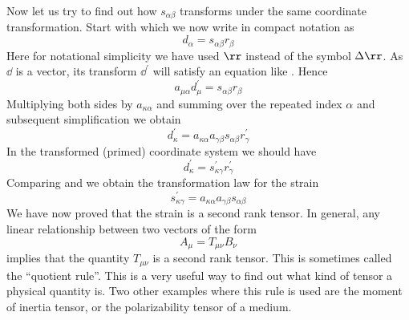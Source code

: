 \documentclass{tufte-book} %
\begin{document}
\begin{subappendices}
Now let us try to find out how $s_{\alpha\beta}$ transforms
under the same coordinate transformation. Start with 
which we now write in compact notation as 
\begin{equation}
d_{\alpha} = s_{\alpha\beta}r_{\beta}
\end{equation}
Here for notational simplicity we have used $\rr$ instead of the
symbol $\Delta \rr$. 
As $\dd$ is a vector, its transform $\dd^{\prime}$ will satisfy an 
equation like . Hence
\begin{equation}
a_{\mu\alpha}d^{\prime}_{\mu} = s_{\alpha\beta}r_{\beta}
\end{equation} 
Multiplying both sides by $a_{\kappa\alpha}$ and summing over the
repeated index $\alpha$ and subsequent simplification we obtain
\begin{equation}
d^{\prime}_{\kappa} =
  a_{\kappa\alpha}a_{\gamma\beta}s_{\alpha\beta}r^{\prime}_{\gamma}
\label{eq:ss}
\end{equation}
In the transformed (primed) coordinate system we should have 
\begin{equation}
d^{\prime}_{\kappa} = s^{\prime}_{\kappa\gamma}r^{\prime}_{\gamma}
\label{eq:sprime}
\end{equation}
Comparing  and  we obtain the transformation
law for the strain
\begin{equation}
\boxed{s^{\prime}_{\kappa\gamma} = a_{\kappa\alpha}a_{\gamma\beta}s_{\alpha\beta}}
\end{equation}
We have now proved that the strain is a second rank tensor. In
general, any linear relationship between two vectors of the form
\begin{equation}
A_{\mu} = T_{\mu\nu}B_{\nu}
\label{eq:quotient}
\end{equation}
implies that the quantity $T_{\mu\nu}$ is a second rank tensor. 
This is sometimes called the ``quotient rule''. 
This is a very useful way to find out what kind of tensor a physical
quantity is. Two other examples where this rule is used are the moment of inertia tensor, or the polarizability
tensor of a medium. 


\end{subappendices}
\end{document}
